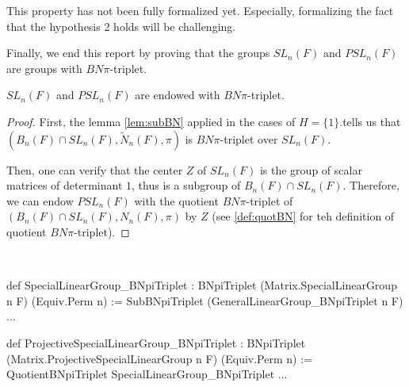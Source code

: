 \begin{remark}
    This property has not been fully formalized yet. Especially, formalizing the fact that the hypothesis 2 holds will be challenging.
\end{remark}



Finally, we end this report by proving that the groups $SL_n(F)$ and $PSL_n(F)$ are groups with $BN\pi$-triplet.

\begin{proposition}
    $SL_n\left( F \right)$ and $PSL_n\left( F \right)$ are endowed with $BN\pi$-triplet. 
\end{proposition}
\begin{proof}
    First, the lemma \ref{lem:subBN} applied in the cases of $H = \{1\}$.tells us that $\left( B_n\left( F \right) \cap SL_n(F), \tilde{N}_n(F), \pi \right)$ is $BN\pi$-triplet over $SL_n(F)$.

    Then, one can verify that the center $Z$ of $SL_n\left( F \right)$ is the group of scalar matrices of determinant $1$, thus is a subgroup of $B_n(F) \cap SL_n\left( F \right)$. Therefore, we can endow $PSL_n(F)$ with the quotient $BN\pi$-triplet of $\left( B_n(F) \cap SL_n(F), N_n(F), \pi \right)$ by $Z$ (see \ref{def:quotBN} for teh definition of quotient $BN\pi$-triplet).
\end{proof}

\begin{implementation} \
\begin{leancode}
def SpecialLinearGroup_BNpiTriplet : BNpiTriplet (Matrix.SpecialLinearGroup n F) (Equiv.Perm n) :=
  SubBNpiTriplet (GeneralLinearGroup_BNpiTriplet n F) ...

def ProjectiveSpecialLinearGroup_BNpiTriplet :
  BNpiTriplet (Matrix.ProjectiveSpecialLinearGroup n F) (Equiv.Perm n) :=
    QuotientBNpiTriplet SpecialLinearGroup_BNpiTriplet ...
\end{leancode}
\end{implementation}
